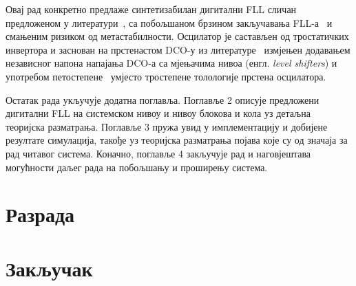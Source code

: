 \documentclass[master]{finthesis}
\begin{document}
Овај рад конкретно предлаже синтетизабилан дигитални FLL сличан предложеном у литератури~\cite{Musa:6644316}, са побољшаном брзином закључавања FLL-а~\cite{Deng:6891375} и смањеним ризиком од метастабилности. Осцилатор је састављен од тростатичких инвертора и заснован на прстенастом DCO-у из литературе~\cite{Tierno:4443210} измјењен додавањем независног напона напајања DCO-а са мјењачима нивоа (енгл. \textit{level shifters}) и употребом петостепене~\cite{Rylyakov:4523284} умјесто тростепене толологије прстена осцилатора.

Остатак рада укључује додатна поглавља. Поглавље 2 описује предложени дигитални FLL на системском нивоу и нивоу блокова и кола уз детаљна теоријска разматрања. Поглавље 3 пружа увид у имплементацију и добијене резултате симулација, такође уз теоријска разматрања појава које су од значаја за рад читавог система. Коначно, поглавље 4 закључује рад и наговјештава могућности даљег рада на побољшању и проширењу система.


\section{Разрада}

\section{Закључак}

\makebibliography
\end{document}
